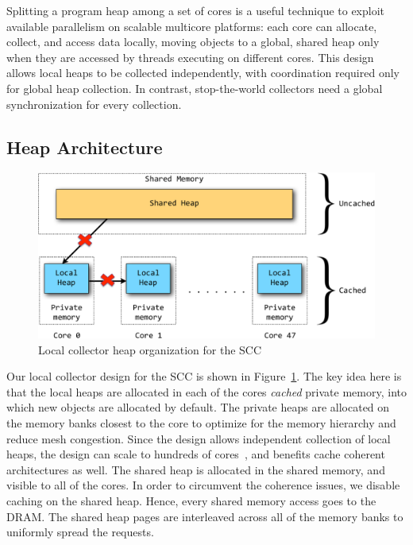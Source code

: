 Splitting a program heap among a set of cores is a useful technique to exploit
available parallelism on scalable multicore platforms: each core can allocate,
collect, and access data locally, moving objects to a global, shared heap only
when they are accessed by threads executing on different cores. This design
allows local heaps to be collected independently, with coordination required
only for global heap collection. In contrast, stop-the-world collectors need a
global synchronization for every collection.

\subsection{Heap Architecture}

\begin{figure}
\centering
\includegraphics[width=1\textwidth]{Figures/LocalCollector.pdf}
\caption{Local collector heap organization for the SCC}
\label{fig:lc}
\end{figure}


Our local collector design for the SCC is shown in Figure~\ref{fig:lc}. The key
idea here is that the local heaps are allocated in each of the cores
\emph{cached} private memory, into which new objects are allocated by default.
The private heaps are allocated on the memory banks closest to the core to
optimize for the memory hierarchy and reduce mesh congestion. Since the design
allows independent collection of local heaps, the design can scale to hundreds
of cores~\cite{JFP14}, and benefits cache coherent architectures as well. The
shared heap is allocated in the shared memory, and visible to all of the cores.
In order to circumvent the coherence issues, we disable caching on the shared
heap. Hence, every shared memory access goes to the DRAM. The shared heap pages
are interleaved across all of the memory banks to uniformly spread the
requests.

